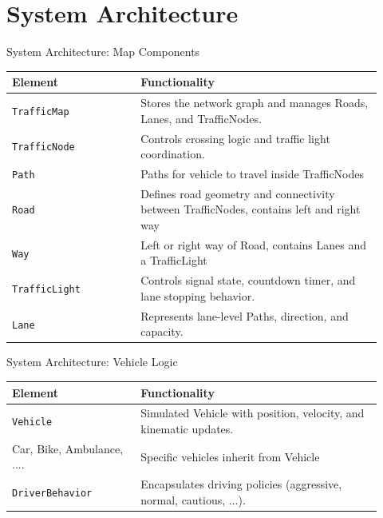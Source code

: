 \documentclass[aspectratio=169, 10pt]{beamer}
\begin{document}
\section{System Architecture}
\begin{frame}{System Architecture: Map Components}
    \begin{table}
        \centering
        \begin{tabular}{|p{0.32\linewidth} |p{0.60\linewidth}|}
            \hline
            \textbf{Element} & \textbf{Functionality} \\
            \hline
            \texttt{TrafficMap} & Stores the network graph and manages Roads, Lanes, and TrafficNodes. \\\hline
            \texttt{TrafficNode} & Controls crossing logic and traffic light coordination. \\\hline
            \texttt{Path} & Paths for vehicle to travel inside TrafficNodes\\\hline
            \texttt{Road} & Defines road geometry and connectivity between TrafficNodes, contains left and right way\\\hline
            \texttt{Way} &  Left or right way of Road, contains Lanes and a TrafficLight\\\hline
            \texttt{TrafficLight} & Controls signal state, countdown timer, and lane stopping behavior. \\\hline
            \texttt{Lane} & Represents lane-level Paths, direction, and capacity. \\
            \hline
        \end{tabular}
    \end{table}
\end{frame}

\begin{frame}{System Architecture: Vehicle Logic}
    \begin{table}
        \centering
        \begin{tabular}{|p{0.32\linewidth} |p{0.60\linewidth}|}
            \hline
            \textbf{Element} & \textbf{Functionality} \\
            \hline
            \texttt{Vehicle} & Simulated Vehicle with position, velocity, and kinematic updates.\\\hline
 Car, Bike, Ambulance, ....&Specific vehicles inherit from Vehicle\\\hline
            \texttt{DriverBehavior} & Encapsulates driving policies (aggressive, normal, cautious, ...).\\
            \hline
        \end{tabular}
    \end{table}
\end{frame}
\end{document}
